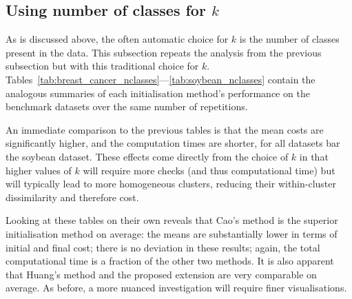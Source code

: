 \subsection{Using number of classes for \(k\)}\label{subsec:nclasses}

As is discussed above, the often automatic choice for \(k\) is the number of
classes present in the data. This subsection repeats the analysis from the
previous subsection but with this traditional choice for \(k\).
Tables~\ref{tab:breast_cancer_nclasses}---\ref{tab:soybean_nclasses} contain the
analogous summaries of each initialisation method's performance on the benchmark
datasets over the same number of repetitions.

\begin{table}[htbp]
    \centering
    \resizebox{\textwidth}{!}{%
        
    }
    \label{tab:breast_cancer_nclasses}\vspace{2em}

    \resizebox{\textwidth}{!}{%
        
    }
    \label{tab:mushroom_nclasses}\vspace{2em}

    \resizebox{\textwidth}{!}{%
        
    }
    \label{tab:nursery_nclasses}\vspace{2em}

    \resizebox{\textwidth}{!}{%
        
    }
    \label{tab:soybean_nclasses}
\end{table}

An immediate comparison to the previous tables is that the mean costs are
significantly higher, and the computation times are shorter, for all datasets
bar the soybean dataset. These effects come directly from the choice of \(k\) in
that higher values of \(k\) will require more checks (and thus computational
time) but will typically lead to more homogeneous clusters, reducing their
within-cluster dissimilarity and therefore cost.

Looking at these tables on their own reveals that Cao's method is the superior
initialisation method on average: the means are substantially lower in terms of
initial and final cost; there is no deviation in these results; again, the total
computational time is a fraction of the other two methods. It is also apparent
that Huang's method and the proposed extension are very comparable on average.
As before, a more nuanced investigation will require finer visualisations.

